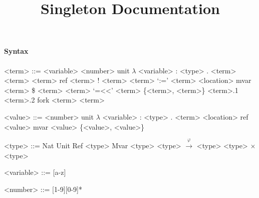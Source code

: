 \documentclass[10pt]{article}
\title{Singleton Documentation}
\newcommand{\xto}{\xrightarrow}
\theoremstyle{definition}\newtheorem*{theorem}{Theorem}
\theoremstyle{definition}\newtheorem*{definition}{Definition}
\theoremstyle{definition}\newtheorem*{lemma}{Lemma}
\begin{document}
	\maketitle
    \paragraph{Syntax}
    \setlength{\grammarindent}{8em} %
    \begin{grammar}
        <term> ::= <variable> 
        \vspace{0.8em}
        \alt <number>
        \vspace{0.8em}
        \alt unit
        \vspace{0.8em}
        \alt $\lambda$ <variable> : <type> . <term>
        \vspace{0.8em}
        \alt <term> <term>
        \vspace{0.8em}
        \alt ref <term> 
        \vspace{0.8em}
        \alt ! <term>
        \vspace{0.8em}
        \alt <term> `:=' <term>
        \vspace{0.8em}
        \alt <location>
        \vspace{0.8em}
        \alt mvar <term> 
        \vspace{0.8em}
        \alt \$ <term>
        \vspace{0.8em}
        \alt <term> `=<<' <term>
        \vspace{0.8em}
        \alt \{\;<term>, <term>\;\}
        \vspace{0.8em}
        \alt <term>.1
        \vspace{0.8em}
        \alt <term>.2
        \vspace{0.8em}
        \alt fork <term> <term>

        <value> ::= <number>
        \vspace{0.8em}
        \alt unit
        \vspace{0.8em}
        \alt $\lambda$ <variable> : <type> . <term>
        \vspace{0.8em}
        \alt <location>
        \vspace{0.8em}
        \alt ref <value>
        \vspace{0.8em}
        \alt mvar <value>
        \vspace{0.8em}
        \alt \{\;<value>, <value>\;\}

        <type> ::= Nat
        \vspace{0.8em}
        \alt Unit
        \vspace{0.8em}
        \alt Ref <type>
        \vspace{0.8em}
        \alt Mvar <type>
        \vspace{0.8em}
        \alt <type> $\xto{\varphi}$ <type>
        \vspace{0.8em}
        \alt <type> $\times$ <type>

        <variable> ::= [a-z]

        <number> ::= [1-9][0-9]*
    \end{grammar}
\end{document}
